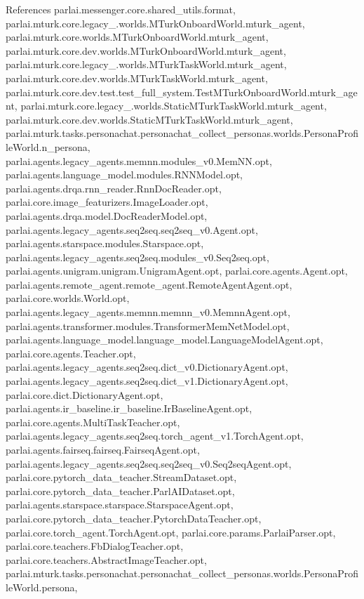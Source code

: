 References parlai.\+messenger.\+core.\+shared\+\_\+utils.\+format, parlai.\+mturk.\+core.\+legacy\+\_.\+worlds.\+M\+Turk\+Onboard\+World.\+mturk\+\_\+agent, parlai.\+mturk.\+core.\+worlds.\+M\+Turk\+Onboard\+World.\+mturk\+\_\+agent, parlai.\+mturk.\+core.\+dev.\+worlds.\+M\+Turk\+Onboard\+World.\+mturk\+\_\+agent, parlai.\+mturk.\+core.\+legacy\+\_.\+worlds.\+M\+Turk\+Task\+World.\+mturk\+\_\+agent, parlai.\+mturk.\+core.\+dev.\+worlds.\+M\+Turk\+Task\+World.\+mturk\+\_\+agent, parlai.\+mturk.\+core.\+dev.\+test.\+test\+\_\+full\+\_\+system.\+Test\+M\+Turk\+Onboard\+World.\+mturk\+\_\+agent, parlai.\+mturk.\+core.\+legacy\+\_.\+worlds.\+Static\+M\+Turk\+Task\+World.\+mturk\+\_\+agent, parlai.\+mturk.\+core.\+dev.\+worlds.\+Static\+M\+Turk\+Task\+World.\+mturk\+\_\+agent, parlai.\+mturk.\+tasks.\+personachat.\+personachat\+\_\+collect\+\_\+personas.\+worlds.\+Persona\+Profile\+World.\+n\+\_\+persona, parlai.\+agents.\+legacy\+\_\+agents.\+memnn.\+modules\+\_\+v0.\+Mem\+N\+N.\+opt, parlai.\+agents.\+language\+\_\+model.\+modules.\+R\+N\+N\+Model.\+opt, parlai.\+agents.\+drqa.\+rnn\+\_\+reader.\+Rnn\+Doc\+Reader.\+opt, parlai.\+core.\+image\+\_\+featurizers.\+Image\+Loader.\+opt, parlai.\+agents.\+drqa.\+model.\+Doc\+Reader\+Model.\+opt, parlai.\+agents.\+legacy\+\_\+agents.\+seq2seq.\+seq2seq\+\_\+v0.\+Agent.\+opt, parlai.\+agents.\+starspace.\+modules.\+Starspace.\+opt, parlai.\+agents.\+legacy\+\_\+agents.\+seq2seq.\+modules\+\_\+v0.\+Seq2seq.\+opt, parlai.\+agents.\+unigram.\+unigram.\+Unigram\+Agent.\+opt, parlai.\+core.\+agents.\+Agent.\+opt, parlai.\+agents.\+remote\+\_\+agent.\+remote\+\_\+agent.\+Remote\+Agent\+Agent.\+opt, parlai.\+core.\+worlds.\+World.\+opt, parlai.\+agents.\+legacy\+\_\+agents.\+memnn.\+memnn\+\_\+v0.\+Memnn\+Agent.\+opt, parlai.\+agents.\+transformer.\+modules.\+Transformer\+Mem\+Net\+Model.\+opt, parlai.\+agents.\+language\+\_\+model.\+language\+\_\+model.\+Language\+Model\+Agent.\+opt, parlai.\+core.\+agents.\+Teacher.\+opt, parlai.\+agents.\+legacy\+\_\+agents.\+seq2seq.\+dict\+\_\+v0.\+Dictionary\+Agent.\+opt, parlai.\+agents.\+legacy\+\_\+agents.\+seq2seq.\+dict\+\_\+v1.\+Dictionary\+Agent.\+opt, parlai.\+core.\+dict.\+Dictionary\+Agent.\+opt, parlai.\+agents.\+ir\+\_\+baseline.\+ir\+\_\+baseline.\+Ir\+Baseline\+Agent.\+opt, parlai.\+core.\+agents.\+Multi\+Task\+Teacher.\+opt, parlai.\+agents.\+legacy\+\_\+agents.\+seq2seq.\+torch\+\_\+agent\+\_\+v1.\+Torch\+Agent.\+opt, parlai.\+agents.\+fairseq.\+fairseq.\+Fairseq\+Agent.\+opt, parlai.\+agents.\+legacy\+\_\+agents.\+seq2seq.\+seq2seq\+\_\+v0.\+Seq2seq\+Agent.\+opt, parlai.\+core.\+pytorch\+\_\+data\+\_\+teacher.\+Stream\+Dataset.\+opt, parlai.\+core.\+pytorch\+\_\+data\+\_\+teacher.\+Parl\+A\+I\+Dataset.\+opt, parlai.\+agents.\+starspace.\+starspace.\+Starspace\+Agent.\+opt, parlai.\+core.\+pytorch\+\_\+data\+\_\+teacher.\+Pytorch\+Data\+Teacher.\+opt, parlai.\+core.\+torch\+\_\+agent.\+Torch\+Agent.\+opt, parlai.\+core.\+params.\+Parlai\+Parser.\+opt, parlai.\+core.\+teachers.\+Fb\+Dialog\+Teacher.\+opt, parlai.\+core.\+teachers.\+Abstract\+Image\+Teacher.\+opt, parlai.\+mturk.\+tasks.\+personachat.\+personachat\+\_\+collect\+\_\+personas.\+worlds.\+Persona\+Profile\+World.\+persona, 